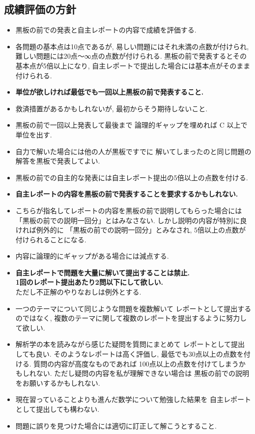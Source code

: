 \documentclass[12pt,twoside]{jarticle}
\begin{document}
\subsection{成績評価の方針}

{\small
\begin{itemize}
 \item 黒板の前での発表と自主レポートの内容で成績を評価する.
 \item 各問題の基本点は10点であるが, 
       易しい問題にはそれ未満の点数が付けられ, 
       難しい問題には20点〜∞点の点数が付けられる.
       黒板の前で発表するとその基本点が5倍以上になり, 
       自主レポートで提出した場合には基本点がそのまま付けられる.
 \item {\bf 単位が欲しければ最低でも一回以上黒板の前で発表すること.}
 \item 救済措置があるかもしれないが, 最初からそう期待しないこと.
 \item 黒板の前で一回以上発表して最後まで
       論理的ギャップを埋めれば C 以上で単位を出す.
 \item 自力で解いた場合には他の人が黒板ですでに
       解いてしまったのと同じ問題の解答を黒板で発表してよい.
 \item 黒板の前での自主的な発表には自主レポート提出の5倍以上の点数を付ける.
 \item {\bf 自主レポートの内容を黒板の前で発表することを要求するかもしれない.}
 \item こちらが指名してレポートの内容を黒板の前で説明してもらった場合には
       「黒板の前での説明一回分」とはみなさない.
       しかし説明の内容が特別に良ければ例外的に
       「黒板の前での説明一回分」とみなされ, 
       5倍以上の点数が付けられることになる.
 \item 内容に論理的にギャップがある場合には減点する.
 \item {\bf 自主レポートで問題を大量に解いて提出することは禁止.\\
       1回のレポート提出あたり2問以下にして欲しい.}\\
       ただし不正解のやりなおしは例外とする.
 \item 一つのテーマについて同じような問題を複数解いて
       レポートとして提出するのではなく, 
       複数のテーマに関して複数のレポートを提出するように努力して欲しい.
 \item 解析学の本を読みながら感じた疑問を質問にまとめて
       レポートとして提出しても良い.
       そのようなレポートは高く評価し, 
       最低でも30点以上の点数を付ける.
       質問の内容が高度なものであれば
       100点以上の点数を付けてしまうかもしれない.
       ただし疑問の内容を私が理解できない場合は
       黒板の前での説明をお願いするかもしれない.
 \item 現在習っていることよりも進んだ数学について勉強した結果を
       自主レポートとして提出しても構わない.
 \item 問題に誤りを見つけた場合には適切に訂正して解こうとすること.
\end{itemize}
}
\end{document}
